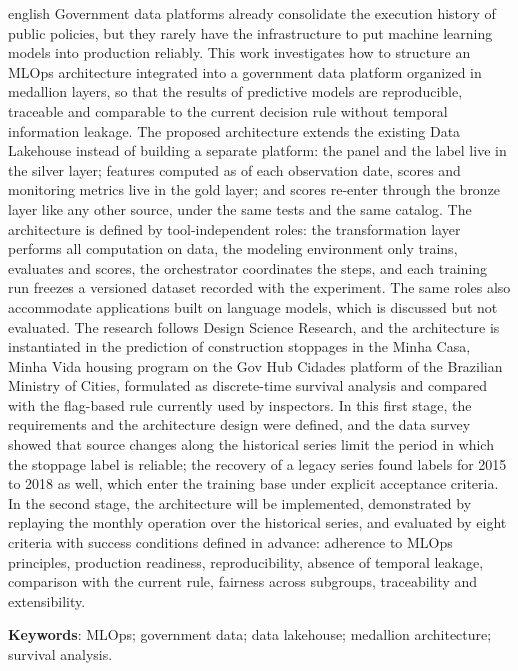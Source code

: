 \begin{resumo}[Abstract]
 \begin{otherlanguage*}{english}
   Government data platforms already consolidate the execution history of public policies, but they rarely have the infrastructure to put machine learning models into production reliably. This work investigates how to structure an MLOps architecture integrated into a government data platform organized in medallion layers, so that the results of predictive models are reproducible, traceable and comparable to the current decision rule without temporal information leakage. The proposed architecture extends the existing Data Lakehouse instead of building a separate platform: the panel and the label live in the silver layer; features computed as of each observation date, scores and monitoring metrics live in the gold layer; and scores re-enter through the bronze layer like any other source, under the same tests and the same catalog. The architecture is defined by tool-independent roles: the transformation layer performs all computation on data, the modeling environment only trains, evaluates and scores, the orchestrator coordinates the steps, and each training run freezes a versioned dataset recorded with the experiment. The same roles also accommodate applications built on language models, which is discussed but not evaluated. The research follows Design Science Research, and the architecture is instantiated in the prediction of construction stoppages in the Minha Casa, Minha Vida housing program on the Gov Hub Cidades platform of the Brazilian Ministry of Cities, formulated as discrete-time survival analysis and compared with the flag-based rule currently used by inspectors. In this first stage, the requirements and the architecture design were defined, and the data survey showed that source changes along the historical series limit the period in which the stoppage label is reliable; the recovery of a legacy series found labels for 2015 to 2018 as well, which enter the training base under explicit acceptance criteria. In the second stage, the architecture will be implemented, demonstrated by replaying the monthly operation over the historical series, and evaluated by eight criteria with success conditions defined in advance: adherence to MLOps principles, production readiness, reproducibility, absence of temporal leakage, comparison with the current rule, fairness across subgroups, traceability and extensibility.

   \vspace{\onelineskip}

   \noindent
   \textbf{Keywords}: MLOps; government data; data lakehouse; medallion architecture; survival analysis.
 \end{otherlanguage*}
\end{resumo}
